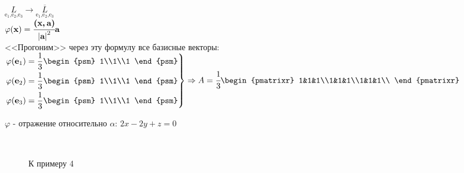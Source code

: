 \noindent$\underset{\text{e$_1$,e$_2$,e$_3$}}{L}\rightarrow\underset{\text{e$_1$,e$_2$,e$_3$}}{\overline{L}}$\\
$\varphi(\textbf{x})=\cfrac{\textbf{(x,\,a)}}{\left|\textbf{a}\right|^2}\textbf{a}$\\
<<Прогоним>> через эту формулу все базисные векторы:\\
$\left.
\begin{aligned}
\phi(\textbf{e$_1$})=\frac{1}{3}\begin{psm}
1\\1\\1
\end{psm}\\
\phi(\textbf{e$_2$})=\frac{1}{3}\begin{psm}
1\\1\\1
\end{psm}\\
\phi(\textbf{e$_3$})=\frac{1}{3}\begin{psm}
1\\1\\1
\end{psm}
\end{aligned}
\right\}\Rightarrow A = \cfrac{1}{3}\begin{pmatrixr}
1&1&1\\1&1&1\\1&1&1\\
\end{pmatrixr}
$
\\
\begin{prim}
	$\varphi$ - отражение относительно $\alpha$: $2x-2y+z=0$
\end{prim}\\

\begin{wrapfigure}{r}{0.35\linewidth}
	\vspace{-2.5cm}
	\def\svgwidth{6cm} %
	
	\caption{К примеру 4}
	\label{...}
	\vspace{-9cm}
\end{wrapfigure}

